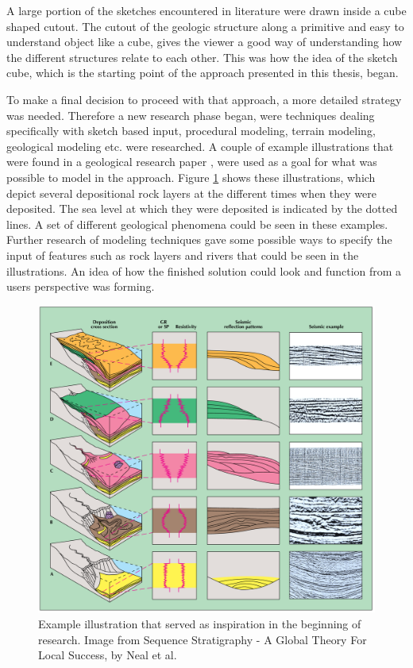 \documentclass[a4paper,12pt]{report}
\begin{document}
A large portion of the sketches encountered in literature were drawn inside a cube shaped cutout. The cutout of the geologic structure along a primitive and easy to understand object like a cube, gives the viewer a good way of understanding how the different structures relate to each other. This was how the idea of the sketch cube, which is the starting point of the approach presented in this thesis, began.

To make a final decision to proceed with that approach, a more detailed strategy was needed. Therefore a new research phase began, were techniques dealing specifically with sketch based input, procedural modeling, terrain modeling, geological modeling etc. were researched. A couple of example illustrations that were found in a geological research paper \cite{neal1993sequence}, were used as a goal for what was  possible to model in the approach. Figure \ref{fig:inspiration1} shows these illustrations, which depict several depositional rock layers at the different times when they were deposited. The sea level at which they were deposited is indicated by the dotted lines. A set of different geological phenomena could be seen in these examples. Further research of modeling techniques gave some possible ways to specify the input of features such as rock layers and rivers that could be seen in the illustrations. An idea of how the finished solution could look and function from a users perspective was forming.


\begin{figure}
 \includegraphics[width=\linewidth]{thesis/inspiration1.png}
 \caption{Example illustration that served as inspiration in the beginning of research. Image from Sequence Stratigraphy - A Global Theory For Local Success, by Neal et al.}
 \label{fig:inspiration1}
\end{figure}
\end{document}

